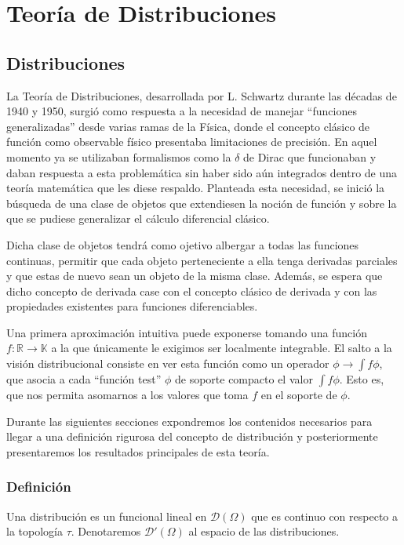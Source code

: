 \chapter{Teoría de Distribuciones}\label{ch:cuarto-capitulo}

\section{Distribuciones}
La Teoría de Distribuciones, desarrollada por L. Schwartz durante las décadas de 1940 y 1950, surgió como respuesta a la necesidad de manejar ``funciones generalizadas''  desde varias ramas de la Física, donde el concepto clásico de función como observable físico presentaba limitaciones de precisión. En aquel momento ya se utilizaban formalismos como la $\delta$ de Dirac que funcionaban y daban respuesta a esta problemática sin haber sido aún integrados dentro de una teoría matemática que les diese respaldo. Planteada esta necesidad, se inició la búsqueda de una clase de objetos que extendiesen la noción de función y sobre la que se pudiese generalizar el cálculo diferencial clásico.  


Dicha clase de objetos tendrá como ojetivo albergar a todas las funciones continuas, permitir que cada objeto perteneciente a ella tenga derivadas parciales y que estas de nuevo sean un objeto de la misma clase. Además, se espera que dicho concepto de derivada case con el concepto clásico de derivada y con las propiedades existentes para funciones diferenciables.  

Una primera aproximación intuitiva puede exponerse tomando una función $f: \mathds{R}\rightarrow \mathds{K}$ a la que únicamente le exigimos ser localmente integrable. El salto a la visión distribucional consiste en ver esta función como un operador $\phi \rightarrow \int f \phi$, que asocia a cada ``función test''  $\phi$ de soporte compacto el valor $\int f \phi$. Esto es, que nos permita asomarnos a los valores que toma $f$ en el soporte de $\phi$.   

Durante las siguientes secciones expondremos los contenidos necesarios para llegar a una definición rigurosa del concepto de distribución y posteriormente presentaremos los resultados principales de esta teoría. 
\subsection{Definición}
\begin{definicion}
Una distribución es un funcional lineal en $\mathcal{D}(\Omega)$ que es continuo con respecto a la topología $\tau$. Denotaremos $\mathcal{D}'(\Omega)$ al espacio de las distribuciones.
\end{definicion}

